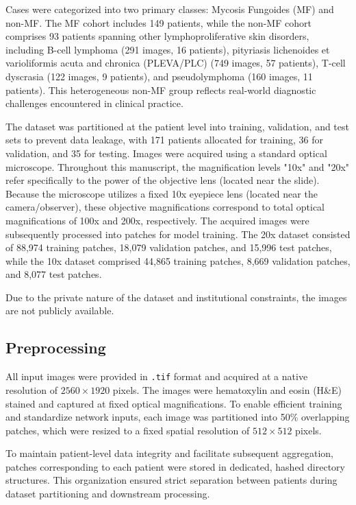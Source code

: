 \documentclass[conference]{IEEEtran}
\begin{document}
Cases were categorized into two primary classes: Mycosis Fungoides (MF) and non-MF. The MF cohort includes 149 patients, 
while the non-MF cohort comprises 93 patients spanning other lymphoproliferative skin disorders, including B-cell lymphoma (291 images, 16 patients), 
pityriasis lichenoides et varioliformis acuta and chronica (PLEVA/PLC) (749 images, 57 patients), T-cell dyscrasia (122 images, 9 patients), and pseudolymphoma (160 images, 11 patients). 
This heterogeneous non-MF group reflects real-world diagnostic challenges encountered in clinical practice.

The dataset was partitioned at the patient level into training, validation, and test sets to prevent data 
leakage, with 171 patients allocated for training, 36 for validation, and 35 for testing. 
Images were acquired using a standard optical microscope. 
Throughout this manuscript, the magnification levels "10x" and "20x" refer specifically to the 
power of the objective lens (located near the slide). Because the microscope utilizes a fixed 10x 
eyepiece lens (located near the camera/observer), these objective magnifications correspond to total 
optical magnifications of 100x and 200x, respectively. The acquired images were subsequently processed 
into patches for model training. The 20x dataset consisted of 88,974 training patches, 18,079 validation patches, 
and 15,996 test patches, while the 10x dataset comprised 44,865 training patches, 8,669 validation patches, 
and 8,077 test patches.

Due to the private nature of the dataset and institutional constraints, the images are not publicly available.


\subsection{Preprocessing}
All input images were provided in \texttt{.tif} format and acquired at a native resolution of $2560 \times 1920$ pixels. The images were hematoxylin and eosin (H\&E) stained and captured at fixed optical magnifications. To enable efficient training and standardize network inputs, each image was partitioned into 50\% overlapping patches, which were resized to a fixed spatial resolution of $512 \times 512$ pixels.

To maintain patient-level data integrity and facilitate subsequent aggregation, patches corresponding to each patient were stored in dedicated, hashed directory structures. This organization ensured strict separation between patients during dataset partitioning and downstream processing.
\end{document}

